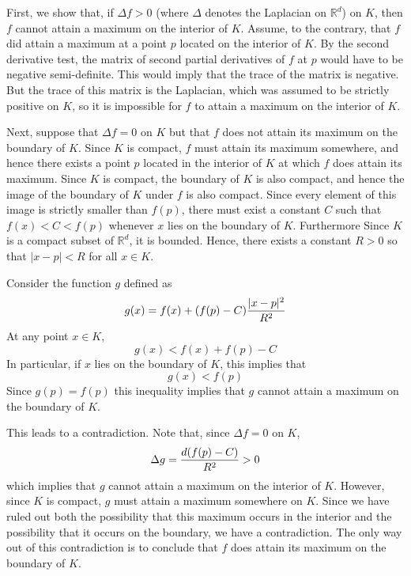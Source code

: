 \documentclass[12pt]{article}
\begin{document}
First, we show that, if $\Delta f > 0$ (where $\Delta$ denotes the Laplacian on $\mathbb{R}^d$) on $K$, then $f$ cannot attain a maximum on the interior of $K$.  Assume, to the contrary, that $f$ did attain a maximum at a point $p$ located on the interior of $K$.  By the second derivative test, the matrix of second partial derivatives of $f$ at $p$ would have to be negative semi-definite.  This would imply that the trace of the matrix is negative.  But the trace of this matrix is the Laplacian, which was assumed to be strictly positive on $K$, so it is impossible for $f$ to attain a maximum on the interior of $K$.

Next, suppose that $\Delta f = 0$ on $K$ but that $f$ does not attain its maximum on the boundary of $K$.  Since $K$ is compact, $f$ must attain its maximum somewhere, and hence there exists a point $p$ located in the interior of $K$ at which $f$ does attain its maximum.  Since $K$ is compact, the boundary of $K$ is also compact, and hence the image of the boundary of $K$ under $f$ is also compact.  Since every element of this image is strictly smaller than $f(p)$, there must exist a constant $C$ such that $f(x) < C < f(p)$ whenever $x$ lies on the boundary of $K$.  Furthermore Since $K$ is a compact subset of $\mathbb{R}^d$, it is bounded.  Hence, there exists a constant $R>0$ so that $|x - p| < R$ for all $x \in K$.

Consider the function $g$ defined as
 \[g(x) = f(x) + (f(p) - C) {|x-p|^2 \over R^2}\]
At any point $x \in K$,
 \[g(x) < f(x) + f(p) - C\]
In particular, if $x$ lies on the boundary of $K$, this implies that
 \[g(x) < f(p)\]
Since $g(p) = f(p)$ this inequality implies that $g$ cannot attain a maximum on the boundary of $K$.

This leads to a contradiction.  Note that, since $\Delta f = 0$ on $K$,
 \[\Delta g = {d (f(p) - C) \over R^2} > 0\]
which implies that $g$ cannot attain a maximum on the interior of $K$.  However, since $K$ is compact, $g$ must attain a maximum somewhere on $K$.  Since we have ruled out both the possibility that this maximum occurs in the interior and the possibility that it occurs on the boundary, we have a contradiction.  The only way out of this contradiction is to conclude that $f$ does attain its maximum on the boundary of $K$.
\end{document}

